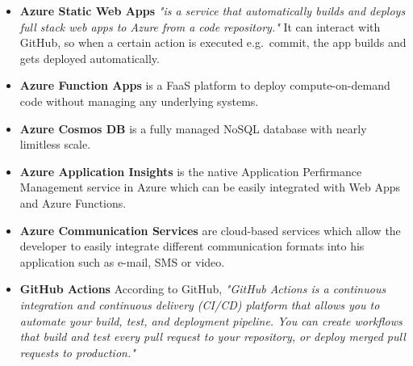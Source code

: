 \begin{itemize}
	\item \textbf{Azure Static Web Apps} \emph{"is a service that automatically builds and deploys full stack web apps to Azure from a code repository."} It can interact with GitHub, so when a certain action is executed e.g.\ commit, the app builds and gets deployed automatically.\cite{StaticWebApps}
	
	\item \textbf{Azure Function Apps} is a FaaS platform to deploy compute-on-demand code without managing any underlying systems. \cite{ArchExample1}
	
	\item \textbf{Azure Cosmos DB} is a fully managed NoSQL database with nearly limitless scale. \cite{ArchExample1}
	
	\item \textbf{Azure Application Insights} is the native Application Perfirmance Management service in Azure which can be easily integrated with Web Apps and Azure Functions. \cite{ArchExample1}
	
	\item \textbf{Azure Communication Services} are cloud-based services which allow the developer to easily integrate different communication formats into his application such as e-mail, SMS or video. \cite{CommunicationServices}
	
	\item \textbf{GitHub Actions} According to GitHub, \emph{"GitHub Actions is a continuous integration and continuous delivery (CI/CD) platform that allows you to automate your build, test, and deployment pipeline. You can create workflows that build and test every pull request to your repository, or deploy merged pull requests to production."} \cite{GitHubActions}
	
\end{itemize}





